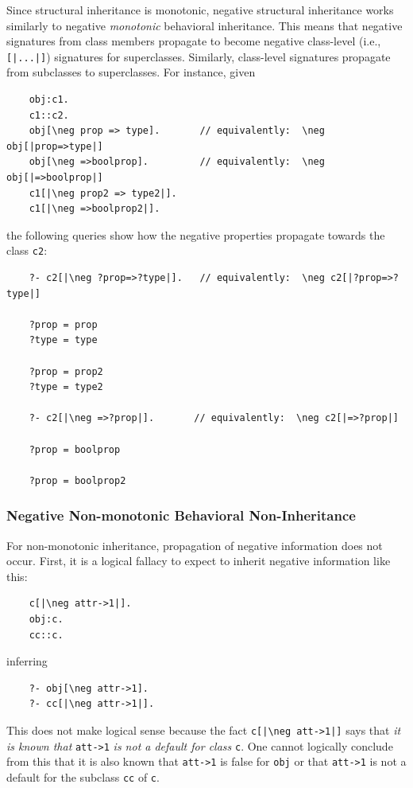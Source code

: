 \documentclass[11pt]{article}
\newcommand{\bs}{\textbackslash}
\newcommand{\RULELOGNEG}{{\texttt{{\bs}neg}}\xspace}
\begin{document}
Since structural inheritance is monotonic,
negative structural inheritance works similarly to negative \emph{monotonic}
behavioral inheritance. This means that negative signatures from class
members propagate to become negative class-level (i.e.,
\texttt{[|...|]}) signatures for superclasses. Similarly, class-level
signatures propagate from subclasses to superclasses. For instance, given
\begin{verbatim}
    obj:c1.
    c1::c2.
    obj[\neg prop => type].       // equivalently:  \neg obj[|prop=>type|]
    obj[\neg =>boolprop].         // equivalently:  \neg obj[|=>boolprop|]
    c1[|\neg prop2 => type2|].
    c1[|\neg =>boolprop2|].
\end{verbatim}
the following queries show how the negative properties propagate towards
the class \texttt{c2}:
\begin{verbatim}
    ?- c2[|\neg ?prop=>?type|].   // equivalently:  \neg c2[|?prop=>?type|]

    ?prop = prop
    ?type = type

    ?prop = prop2
    ?type = type2

    ?- c2[|\neg =>?prop|].       // equivalently:  \neg c2[|=>?prop|]

    ?prop = boolprop

    ?prop = boolprop2
\end{verbatim}

\subsubsection{Negative Non-monotonic Behavioral Non-Inheritance}

For non-monotonic inheritance, propagation of negative information does not
occur.
First, it is a logical fallacy to expect to inherit negative information like
this:
\begin{verbatim}
    c[|\neg attr->1|].
    obj:c.
    cc::c.
\end{verbatim}
inferring
\begin{verbatim}
    ?- obj[\neg attr->1].
    ?- cc[|\neg attr->1|].
\end{verbatim}
This does not make logical sense because the fact \texttt{c[|\RULELOGNEG att->1|]} says
that \emph{it is known that} \verb|att->1| \emph{is not a default for
  class} \texttt{c}. One cannot logically conclude from this that
it is also known that \verb|att->1| is false for \texttt{obj} or that 
\verb|att->1| is not a default for the subclass \texttt{cc} of \texttt{c}.  
\end{document}
